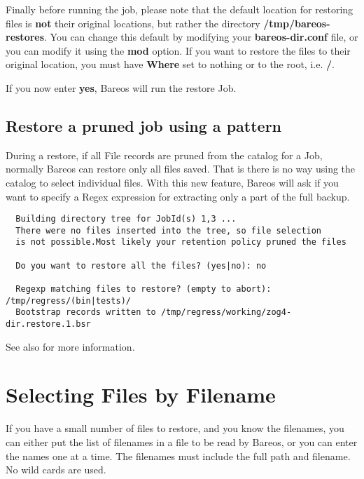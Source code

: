 Finally before running the job, please note that the default location for
restoring files is {\bf not} their original locations, but rather the directory
{\bf /tmp/bareos-restores}. You can change this default by modifying your {\bf
bareos-dir.conf} file, or you can modify it using the {\bf mod} option. If you
want to restore the files to their original location, you must have {\bf
Where} set to nothing or to the root, i.e. {\bf /}.

If you now enter {\bf yes}, Bareos will run the restore Job.

\subsection{Restore a pruned job using a pattern}


  During a restore, if all File records are pruned from the catalog
  for a Job, normally Bareos can restore only all files saved. That
  is there is no way using the catalog to select individual files.
  With this new feature, Bareos will ask if you want to specify a Regex
  expression for extracting only a part of the full backup.

\begin{verbatim}
  Building directory tree for JobId(s) 1,3 ...
  There were no files inserted into the tree, so file selection
  is not possible.Most likely your retention policy pruned the files

  Do you want to restore all the files? (yes|no): no

  Regexp matching files to restore? (empty to abort): /tmp/regress/(bin|tests)/
  Bootstrap records written to /tmp/regress/working/zog4-dir.restore.1.bsr
\end{verbatim}

  See also  for more information.

\section{Selecting Files by Filename}

If you have a small number of files to restore, and you know the filenames,
you can either put the list of filenames in a file to be read by Bareos, or
you can enter the names one at a time. The filenames must include the full
path and filename. No wild cards are used.

